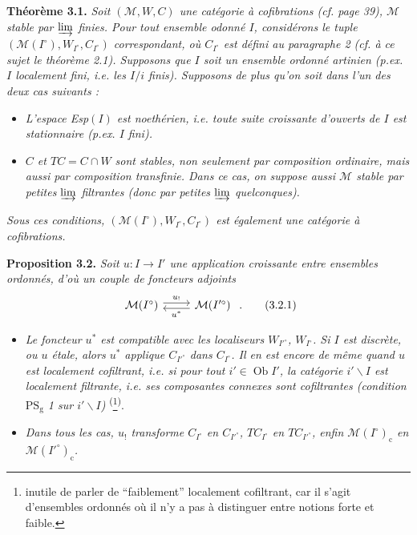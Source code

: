 \documentclass[11pt]{article}
\newcommand{\msp}[1]{\marginpar{\footnotesize [#1]}}
\begin{document}
\msp{50}\textbf{Théorème 3.1.} \textit{Soit $(\mathcal{M},W,C)$ une catégorie à cofibrations (cf. page \textup{39}), $\mathcal{M}$ stable par $\varinjlim$ finies. Pour tout ensemble odonné $I$, considérons le tuple $(\mathcal{M}(I^\circ),W_{I^\circ},C_{I^\circ})$ correspondant, où $C_{I^\circ}$ est défini au paragraphe \textup{2} (cf. à ce sujet le théorème \textup{2.1}). Supposons que $I$ soit un ensemble ordonné \textup{artinien} (p.ex. $I$ localement fini, i.e. les $I/i$ finis). Supposons de plus qu'on soit dans l'un des deux cas suivants :} %
\begin{itemize}[leftmargin=2.5em]
\item[a)] \textit{L'espace \textup{Esp}$(I)$ est noethérien, i.e. toute suite croissante d'ouverts de $I$ est stationnaire (p.ex. $I$ fini).}
\item[b)] \textit{$C$ et $TC=C\cap W$ sont stables, non seulement par composition ordinaire, mais aussi par composition transfinie. Dans ce cas, on suppose aussi $\mathcal{M}$ stable par petites $\varinjlim$ filtrantes (donc par petites $\varinjlim$ quelconques).}
\end{itemize}
\textit{Sous ces conditions, $(\mathcal{M}(I^\circ),W_{I^\circ},C_{I^\circ})$ est également une catégorie à cofibrations.}

\textbf{Proposition 3.2.} \textit{Soit $u:I\longrightarrow I'$ une application croissante entre ensembles ordonnés, d'où un couple de foncteurs adjoints}
\[
\begin{tikzcd}
\mathcal{M}(I^\circ) \arrow[r, shift left, "u_{!}"] & \mathcal{M}(I'^\circ) \arrow[l, shift left, "u^*"]
\end{tikzcd}\ .
\tag*{(3.2.1)}
\]
\msp{51}
\begin{itemize}[leftmargin=2.5em]
\item[a)] \textit{Le foncteur $u^*$ est compatible avec les localiseurs $W_{I'^\circ}$, $W_{I^\circ}$. Si $I$ est discrète, ou $u$ étale, alors $u^*$ applique $C_{I'^\circ}$ dans $C_{I^\circ}$. Il en est encore de même quand $u$ est localement cofiltrant, i.e. si pour tout $i'\in\operatorname{Ob}I'$, la catégorie $i'\backslash I$ est localement filtrante, i.e. ses composantes connexes sont cofiltrantes (condition $\mathrm{PS}_{\mathrm{g}}$ \textup{1} sur $i'\backslash I$)} \textsuperscript{(}\footnote[16]{inutile de parler de ``faiblement'' localement cofiltrant, car il s'agit d'ensembles ordonnés où il n'y a pas à distinguer entre notions forte et faible.}\textsuperscript{)}.
\item[b)] \textit{Dans tous les cas, $u_!$ transforme $C_{I^\circ}$ en $C_{I'^\circ}$, $TC_{I^\circ}$ en $TC_{I'^\circ}$, enfin $\mathcal{M}(I^\circ)_{\mathrm{c}}$ en $\mathcal{M}(I'^\circ)_{\mathrm{c}}$.}
\end{itemize}
\end{document}
